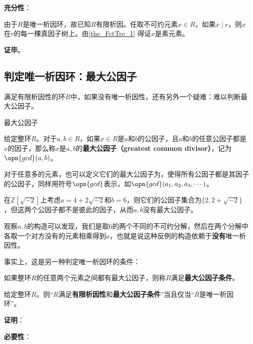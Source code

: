 \textbf{充分性}：

由于$R$是唯一析因环，故已知$R$有限析因。任取不可约元素$x\in R$，如果$x\mid r$，则$x$在$r$的每一棵真因子树上。由\autoref{the_FctTre_1} 得证$x$是素元素。

\textbf{证毕}。







\subsection{判定唯一析因环：最大公因子}



满足有限析因性的环$R$中，如果没有唯一析因性，还有另外一个疑难：难以判断最大公因子。


\begin{definition}{最大公因子}

给定整环$R$。对于$a, b\in R$，如果$x\in R$是$a$和$b$的公因子，且$a$和$b$的任意公因子都是$x$的因子，那么称$x$是$a, b$的\textbf{最大公因子（greatest common divisor）}，记为$\opn{gcd}(a, b)$。

对于任意多的元素，也可以定义它们的最大公因子为，使得所有公因子都是其因子的公因子，同样用符号$\opn{gcd}$表示，如$\opn{gcd}(a_1, a_2, a_3, \cdots)$。

\end{definition}


在$\mathbb{Z}[\sqrt{-2}]$上考虑$a=4+2\sqrt{-2}$和$b=6$，则它们的公因子集合为$\{2, 2+\sqrt{-2}\}$，但这两个公因子都不是彼此的因子，从而$a, b$没有最大公因子。

观察$a, b$的构造可以发现，我们是取$6$的两个不同的不可约分解，然后在两个分解中各取一个对方没有的元素相乘得到$a$，也就是说这种反例的构造依赖于\textbf{没有}唯一析因性。

事实上，这是另一种判定唯一析因环的条件：



\begin{definition}{}
如果整环$R$的任意两个元素之间都有最大公因子，则称$R$满足\textbf{最大公因子条件}。
\end{definition}


\begin{theorem}{}
给定整环$R$。则“$R$满足\textbf{有限析因性}和\textbf{最大公因子条件}”当且仅当“$R$是唯一析因环”。
\end{theorem}


\textbf{证明}：

\textbf{必要性}：

